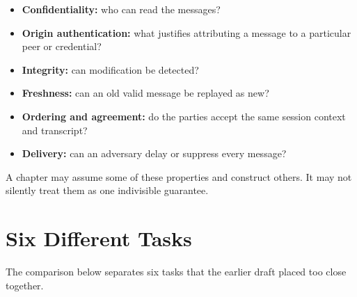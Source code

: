 \begin{itemize}
    \item \textbf{Confidentiality:} who can read the messages?
    \item \textbf{Origin authentication:} what justifies attributing a message
    to a particular peer or credential?
    \item \textbf{Integrity:} can modification be detected?
    \item \textbf{Freshness:} can an old valid message be replayed as new?
    \item \textbf{Ordering and agreement:} do the parties accept the same
    session context and transcript?
    \item \textbf{Delivery:} can an adversary delay or suppress every message?
\end{itemize}

A chapter may assume some of these properties and construct others.  It may
not silently treat them as one indivisible guarantee.

\section{Six Different Tasks}

The comparison below separates six tasks that the earlier draft placed too
close together.

